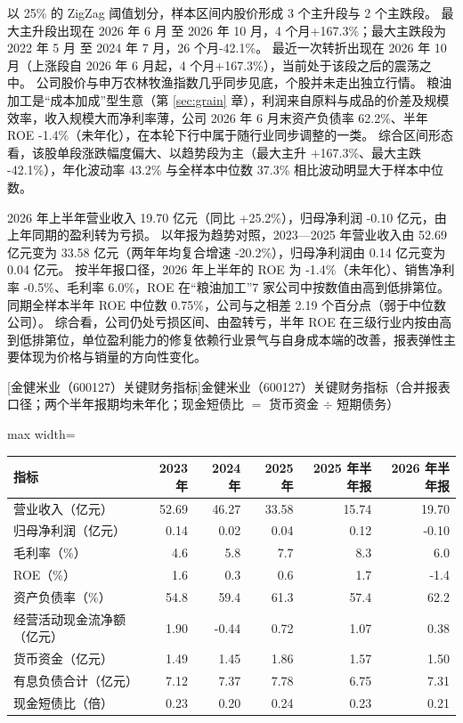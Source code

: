  以 25\% 的 ZigZag 阈值划分，样本区间内股价形成 3 个主升段与 2 个主跌段。 最大主升段出现在 2026 年 6 月 至 2026 年 10 月，4 个月+167.3\%；最大主跌段为 2022 年 5 月 至 2024 年 7 月，26 个月-42.1\%。 最近一次转折出现在 2026 年 10 月（上涨段自 2026 年 6 月起，4 个月+167.3\%），当前处于该段之后的震荡之中。 公司股价与申万农林牧渔指数几乎同步见底，个股并未走出独立行情。 粮油加工是“成本加成”型生意（第 \ref{sec:grain} 章），利润来自原料与成品的价差及规模效率，收入规模大而净利率薄，公司 2026 年 6 月末资产负债率 62.2\%、半年 ROE -1.4\%（未年化），在本轮下行中属于随行业同步调整的一类。 综合区间形态看，该股单段涨跌幅度偏大、以趋势段为主（最大主升 +167.3\%、最大主跌 -42.1\%），年化波动率 43.2\% 与全样本中位数 37.3\% 相比波动明显大于样本中位数。

 2026 年上半年营业收入 19.70 亿元（同比 +25.2\%），归母净利润 -0.10 亿元，由上年同期的盈利转为亏损。 以年报为趋势对照，2023---2025 年营业收入由 52.69 亿元变为 33.58 亿元（两年年均复合增速 -20.2\%），归母净利润由 0.14 亿元变为 0.04 亿元。 按半年报口径，2026 年上半年的 ROE 为 -1.4\%（未年化）、销售净利率 -0.5\%、毛利率 6.0\%，ROE 在“粮油加工”7 家公司中按数值由高到低排第位。 同期全样本半年 ROE 中位数 0.75\%，公司与之相差 2.19 个百分点（弱于中位数公司）。 综合看，公司仍处亏损区间、由盈转亏，半年 ROE 在三级行业内按由高到低排第位，单位盈利能力的修复依赖行业景气与自身成本端的改善，报表弹性主要体现为价格与销量的方向性变化。

\begin{center}\small\setlength{\tabcolsep}{3.4pt}
[金健米业（600127）关键财务指标]{金健米业（600127）关键财务指标（合并报表口径；两个半年报期均未年化；现金短债比 $=$ 货币资金 $\div$ 短期债务）}
\begin{adjustbox}{max width=\textwidth}
\begin{tabular}{@{}lrrrrr@{}}
\toprule
指标 & 2023 年 & 2024 年 & 2025 年 & 2025 年半年报 & 2026 年半年报 \\
\midrule
营业收入（亿元） & 52.69 & 46.27 & 33.58 & 15.74 & 19.70 \\
归母净利润（亿元） & 0.14 & 0.02 & 0.04 & 0.12 & -0.10 \\
毛利率（\%） & 4.6 & 5.8 & 7.7 & 8.3 & 6.0 \\
ROE（\%） & 1.6 & 0.3 & 0.6 & 1.7 & -1.4 \\
资产负债率（\%） & 54.8 & 59.4 & 61.3 & 57.4 & 62.2 \\
经营活动现金流净额（亿元） & 1.90 & -0.44 & 0.72 & 1.07 & 0.38 \\
货币资金（亿元） & 1.49 & 1.45 & 1.86 & 1.57 & 1.50 \\
有息负债合计（亿元） & 7.12 & 7.37 & 7.78 & 6.75 & 7.31 \\
现金短债比（倍） & 0.23 & 0.20 & 0.24 & 0.23 & 0.21 \\
\bottomrule
\end{tabular}
\end{adjustbox}
\end{center}

